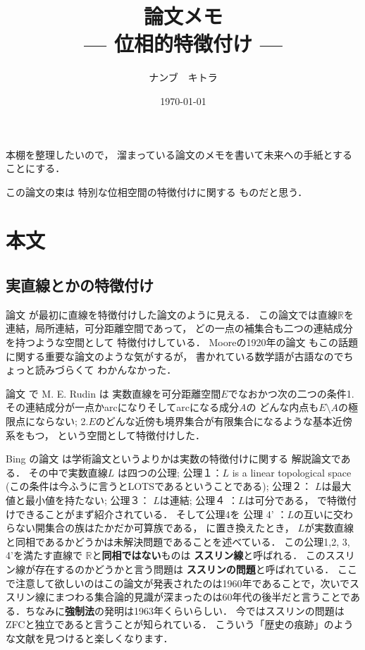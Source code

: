 \documentclass[leqno, a4paper, 12pt]{jsarticle}
\title{論文メモ
\large{\\--- 位相的特徴付け ---}
}
\author{ナンブ　キトラ}
\date{\today}
\newcommand{\rr}{\mathbb{R}}
\begin{document}
\maketitle

本棚を整理したいので，
溜まっている論文のメモを書いて未来への手紙とすることにする．

この論文の束は
特別な位相空間の特徴付けに関する
ものだと思う．

\section{本文}

\subsection{実直線とかの特徴付け}
論文
\cite{ward1936topological}
が最初に直線を特徴付けした論文のように見える．
この論文では直線$\rr$を
連結，局所連結，可分距離空間であって，
どの一点の補集合も二つの連結成分を持つような空間として
特徴付けしている．
Mooreの1920年の論文
\cite{MR1501148}
もこの話題に関する重要な論文のような気がするが，
書かれている数学語が古語なのでちょっと読みづらくて
わかんなかった．

論文
\cite{MR0094774}
で
M. E. Rudin 
は
実数直線を可分距離空間$E$でなおかつ次の二つの条件1. 
その連結成分が一点かarcになりそしてarcになる成分$A$の
どんな内点も$E\setminus A$の極限点にならない;
2.$E$のどんな近傍も境界集合が有限集合になるような基本近傍系をもつ，
という空間として特徴付けした．

Bing の論文
\cite{MR1530892}
は学術論文というよりかは実数の特徴付けに関する
解説論文である．
その中で実数直線$L$
は四つの公理; 公理１：$L$ is a linear topological space 
(この条件は今ふうに言うとLOTSであるということである); 
公理２： $L$は最大値と最小値を持たない; 
公理３： $L$は連結; 
公理４ ：$L$は可分である，
で特徴付けできることがまず紹介されている．
そして公理4を
公理 4' ：$L$の互いに交わらない開集合の族はたかだか可算族である，
に置き換えたとき，
$L$が実数直線と同相であるかどうかは未解決問題であることを述べている．
この公理1,2, 3, 4'を満たす直線で
$\rr$と\textbf{同相ではない}ものは
\textbf{ススリン線}と呼ばれる．
このススリン線が存在するのかどうかと言う問題は
\textbf{ススリンの問題}と呼ばれている．
ここで注意して欲しいのはこの論文が発表されたのは1960年であることで，次いでススリン線にまつわる集合論的見識が深まったのは60年代の後半だと言うことである．ちなみに\textbf{強制法}の発明は1963年くらいらしい．
今ではススリンの問題はZFCと独立であると言うことが知られている．
こういう「歴史の痕跡」のような文献を見つけると楽しくなります．
\end{document}
